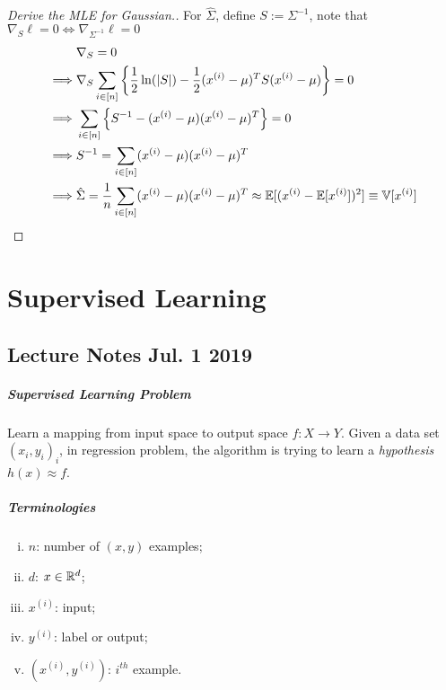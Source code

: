 \documentclass{report}
\begin{document}
\begin{example}
\begin{proof}[Derive the MLE for Gaussian.]
                For $\hat{\Sigma}$, define $S := \Sigma^{-1}$, note that $\nabla_{S} \ell = 0 \iff \nabla_{\Sigma^{-1}} \ell = 0$
                \begin{align}
                    &\nabla_S = 0 \\
                    \implies& \nabla_S \sum_{i \in [n]} \left \{\frac{1}{2}\ln(|S|) - \frac{1}{2} (x^{(i)} - \mu)^T S (x^{(i)} - \mu) \right \} = 0\\
                    \implies& \sum_{i \in [n]} \left\{ S^{-1} - (x^{(i)} - \mu) (x^{(i)} - \mu)^T \right \} = 0 \\
                    \implies& S^{-1} = \sum_{i \in [n]} (x^{(i)} - \mu) (x^{(i)} - \mu)^T \\
                    \implies& \hat{\Sigma} = \frac{1}{n} \sum_{i \in [n]} (x^{(i)} - \mu) (x^{(i)} - \mu)^T \approx \mathbb{E}[{(x^{(i)} - \mathbb{E}[{x^{(i)}}])^2}] \equiv \mathbb{V}[{x^{(i)}}]
                \end{align}
            \end{proof}
        \end{example}
    
    \chapter{Supervised Learning}
    \section{Lecture Notes Jul. 1 2019}
        \paragraph{Supervised Learning Problem} Learn a mapping from input space to output space $f: X \to Y$. Given a data set $(x_i, y_i)_i$, in regression problem, the algorithm is trying to learn a \emph{hypothesis} $h(x) \approx f$.
        
        \paragraph{Terminologies}
        \begin{enumerate}[(i)]
            \item $n$: number of $(x, y)$ examples;
            \item $d$: $x \in \mathbb{R}^d$;
            \item $x^{(i)}$: input;
            \item $y^{(i)}$: label or output;
            \item $(x^{(i)}, y^{(i)})$: $i^{th}$ example.
        \end{enumerate}
\end{document}
